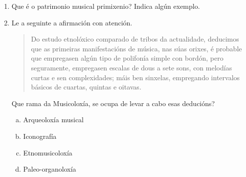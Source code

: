 

\begin{ejercicio}
 \begin{enumerate}[1)]
  \item 
  Que é o patrimonio musical primixenio? 
  Indica algún exemplo. \par
  \vspace*{3.50cm}
 
 \item
 Le a seguinte a afirmación con atención.
 \begin{quote}
 \small{
 Do estudo etnolóxico comparado de tribos da actualidade, deducimos que as primeiras manifestacións de música, nas súas orixes, é probable que empregasen algún tipo de polifonía simple con bordón, pero seguramente, empregasen escalas de dous a sete sons, con melodías curtas e sen complexidades; máis ben sinxelas, empregando intervalos básicos de cuartas, quintas e oitavas.
 }
 \end{quote}
Que rama da Musicoloxía, se ocupa de levar a cabo esas deducións?
\begin{enumerate}[a)]
 \item 
 Arqueoloxía musical
 \item
 Iconografía
 \item
 Etnomusicoloxía %
 \item
 Paleo-organoloxía
\end{enumerate}

 \end{enumerate}
\end{ejercicio}
%
